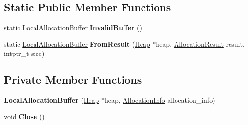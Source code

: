 \subsection*{Static Public Member Functions}
\begin{DoxyCompactItemize}
\item 
static \hyperlink{classv8_1_1internal_1_1_local_allocation_buffer}{Local\+Allocation\+Buffer} {\bfseries Invalid\+Buffer} ()\hypertarget{classv8_1_1internal_1_1_local_allocation_buffer_aed25e6794d01f13f9f875260b168c4d2}{}\label{classv8_1_1internal_1_1_local_allocation_buffer_aed25e6794d01f13f9f875260b168c4d2}

\item 
static \hyperlink{classv8_1_1internal_1_1_local_allocation_buffer}{Local\+Allocation\+Buffer} {\bfseries From\+Result} (\hyperlink{classv8_1_1internal_1_1_heap}{Heap} $\ast$heap, \hyperlink{classv8_1_1internal_1_1_allocation_result}{Allocation\+Result} result, intptr\+\_\+t size)\hypertarget{classv8_1_1internal_1_1_local_allocation_buffer_a2b489f5c4199a70dcf051ebcf76bb4cd}{}\label{classv8_1_1internal_1_1_local_allocation_buffer_a2b489f5c4199a70dcf051ebcf76bb4cd}

\end{DoxyCompactItemize}
\subsection*{Private Member Functions}
\begin{DoxyCompactItemize}
\item 
{\bfseries Local\+Allocation\+Buffer} (\hyperlink{classv8_1_1internal_1_1_heap}{Heap} $\ast$heap, \hyperlink{classv8_1_1internal_1_1_allocation_info}{Allocation\+Info} allocation\+\_\+info)\hypertarget{classv8_1_1internal_1_1_local_allocation_buffer_a3bed0ad47145822fc7c2b6fb20d5a238}{}\label{classv8_1_1internal_1_1_local_allocation_buffer_a3bed0ad47145822fc7c2b6fb20d5a238}

\item 
void {\bfseries Close} ()\hypertarget{classv8_1_1internal_1_1_local_allocation_buffer_a798130ea2a15eef01c3e15ec9321d560}{}\label{classv8_1_1internal_1_1_local_allocation_buffer_a798130ea2a15eef01c3e15ec9321d560}

\end{DoxyCompactItemize}
